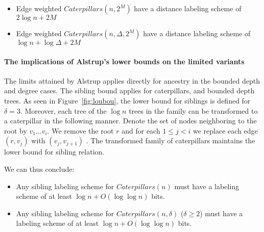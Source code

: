 		
	 \begin{corollary}\label{Cor:lowerbounds}
	 \hfill
	 \begin{itemize}
	 	\item Edge weighted $Caterpillars(n,2^M)$  have a distance labeling scheme of $2 \log n + 2M$
		\item  Edge weighted  $Caterpillars(n,\Delta,2^M)$   have a distance labeling scheme of $ \log n  + \log \Delta + 2M$
	\end{itemize}
	 \end{corollary}
%
%
%	 
%	 

\paragraph{The implications of Alstrup's lower bounds on the limited variants}
The limits attained by Alstrup \cite{Alstrup05} applies directly for ancestry in the bounded depth and degree cases. The sibling bound applies  for caterpillars,  and bounded  depth trees.
As seen in Figure~\ref{fig:loubou}, the lower bound for siblings is defined for $\delta =3$. Moreover, each tree of the $\log n$ trees in the family can be transformed  to a caterpillar in the following manner.
Denote the set of nodes neighboring to the root by $v_1 \dots v_i$.  We remove the root $r$ and for each  $1 \leq  j < i$  we replace each edge $(r,v_j)$ with $(v_j,v_{j+1})$ .
The transformed  family of caterpillars  maintains  the  lower bound for sibling relation.

We can thus conclude:

	\begin{corollary}
	\hfill
	 	\begin{itemize}
		\item  Any sibling labeling scheme for $Caterpillars(n)$  must have a labeling scheme of at least  $ \log n +O(\log \log n)$ bits.
		\item	Any sibling labeling scheme for $Caterpillars(n,\delta)$ ($\delta \geq 2$)  must have a labeling scheme of  at least $ \log n +O(\log \log n)$ bits.
		\end{itemize}
	\end{corollary}


